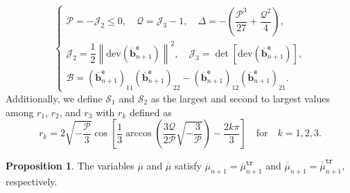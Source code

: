 \documentclass[preprint,11pt]{elsarticle}
\theoremstyle{definition}
\newtheorem{proposition}{Proposition}
\begin{document}
\begin{equation*}
    \left\{ \begin{array}{l}
        \mathcal{P} = - \mathcal{J}_2 \leq 0, \quad
        \mathcal{Q} = \mathcal{J}_3 - 1, \quad
        \Delta = - \left( \dfrac{\mathcal{P}^3}{27} + \dfrac{\mathcal{Q}^2}{4} \right), \\[12pt]

        \mathcal{J}_2 = \dfrac{1}{2} \left\lVert \text{dev} \left( \overline{\mathbf{b}}_{n+1}^\texttt{e} \right) \right\rVert^2, \quad 
        \mathcal{J}_3 = \det \left[ \text{dev} \left( \overline{\mathbf{b}}_{n+1}^\texttt{e} \right) \right], \\[12pt]
   
        \mathcal{B} = \left( \overline{\mathbf{b}}_{n+1}^\texttt{e} \right)_{11} \left( \overline{\mathbf{b}}_{n+1}^\texttt{e} \right)_{22} - \left( \overline{\mathbf{b}}_{n+1}^\texttt{e} \right)_{12} \left( \overline{\mathbf{b}}_{n+1}^\texttt{e} \right)_{21}.
    \end{array} \right.
\end{equation*}
Additionally, we define $\mathcal{S}_1$ and $\mathcal{S}_2$ as the largest and second to largest values among $r_1$, $r_2$, and $r_3$ with $r_k$ defined as
\begin{equation} \label{Trigonometric Solutions}
    r_k = 2 \sqrt{-\dfrac{\mathcal{P}}{3}} \cos \left[ \dfrac{1}{3} \arccos \left( \dfrac{3 \mathcal{Q}}{2 \mathcal{P}} \sqrt{-\dfrac{3}{\mathcal{P}}} \right) - \dfrac{2 k \pi}{3} \right]
    \quad \text{for} \quad
    k = 1, 2, 3.
\end{equation}

\begin{proposition} \label{Compute mu_bar and mu_bar_bar}
The variables $\overline{\mu}$ and $\overline{\overline{\mu}}$ satisfy $\overline{\mu}_{n+1} = \overline{\mu}_{n+1}^\texttt{tr}$ and $\overline{\overline{\mu}}_{n+1} = \overline{\overline{\mu}}_{n+1}^\texttt{tr}$, respectively.
\end{proposition}
\end{document}
